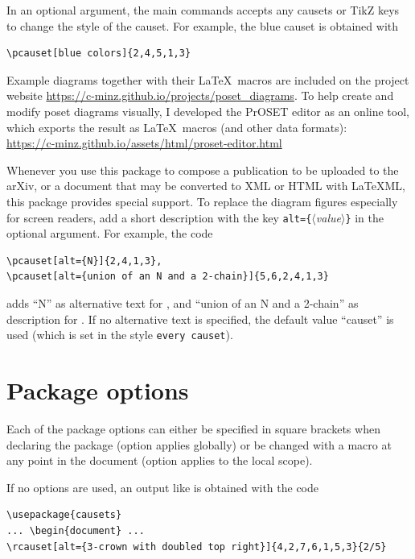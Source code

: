 \documentclass[12pt]{article}
\newcommand*{\PH}[1][value]{{\small\itshape$\langle$#1$\rangle$}} %
\newcommand*{\LaTeXML}{{\LaTeX}ML}
\begin{document}
In an optional argument, the main commands accepts any causets or TikZ keys to change the style of the causet.
For example, the blue causet  is obtained with
\begin{lstlisting}
\pcauset[blue colors]{2,4,5,1,3}
\end{lstlisting}

Example diagrams together with their \LaTeX\ macros are included on the project website \url{https://c-minz.github.io/projects/poset_diagrams}.
To help create and modify poset diagrams visually, I developed the PrOSET editor as an online tool, which exports the result as \LaTeX\ macros (and other data formats): \\
\url{https://c-minz.github.io/assets/html/proset-editor.html}

Whenever you use this package to compose a publication to be uploaded to the arXiv, or a document that may be converted to XML or HTML with \LaTeXML, this package provides special support.
To replace the diagram figures especially for screen readers, add a short description with the key \lstinline&alt={&\PH\lstinline&}& in the optional argument.
For example, the code
\begin{lstlisting}
\pcauset[alt={N}]{2,4,1,3},
\pcauset[alt={union of an N and a 2-chain}]{5,6,2,4,1,3}
\end{lstlisting}
adds ``N'' as alternative text for , and ``union of an N and a 2-chain'' as description for .
If no alternative text is specified, the default value ``causet'' is used (which is set in the style \lstinline&every causet&).


\section{Package options}
\label{sec:PackageOptions}

Each of the package options can either be specified in square brackets when declaring the package (option applies globally) or be changed with a macro at any point in the document (option applies to the local scope).

If no options are used, an output like  is obtained with the code
\begin{lstlisting}
\usepackage{causets}
... \begin{document} ...
\rcauset[alt={3-crown with doubled top right}]{4,2,7,6,1,5,3}{2/5}
\end{lstlisting}
\end{document}

